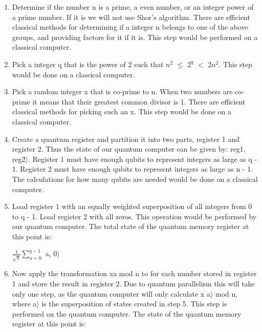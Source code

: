\documentclass{article}
\begin{document}
\begin{enumerate}
    \item
    Determine if the number n is a prime, a even number, or an integer power of a prime number. If it is we will not use Shor's algorithm. There are efficient classical methods for determining if a integer n belongs to one of the above groups, and providing factors for it if it is. This step would be performed on a classical computer.

    \item
    Pick a integer q that is the power of 2 such that $n^2$ $\leq$ $2^q$ $<$ 2$n^2$. This step would be done on a classical computer.

    \item
    Pick a random integer x that is co-prime to n. When two numbers are co-prime it means that their greatest common divisor is 1. There are efficient classical methods for picking such an x. This step would be done on a classical computer.

    \item
    Create a quantum register and partition it into two parts, register 1 and register 2. Thus the state of our quantum computer can be given by: \vert reg1, reg2$ \rangle$. Register 1 must have enough qubits to represent integers as large as q - 1. Register 2 must have enough qubits to represent integers as large as n - 1. The calculations for how many qubits are needed would be done on a classical computer.

    \item
    Load register 1 with an equally weighted superposition of all integers from 0 to q - 1. Load register 2 with all zeros. This operation would be performed by our quantum computer. The total state of the quantum memory register at this point is:

    \begin{center}
    $\displaystyle {\frac{{1}}{{\sqrt{q}}}}$$\displaystyle \sum_{{a = 0}}^{{q - 1}}$ \vert a, 0$\displaystyle \rangle$
    \end{center}

    \item
    Now apply the transformation xa mod n to for each number stored in register 1 and store the result in register 2. Due to quantum parallelism this will take only one step, as the quantum computer will only calculate x \vert a$\scriptstyle \rangle$ mod n, where \vert a$ \rangle$ is the superposition of states created in step 5. This step is performed on the quantum computer. The state of the quantum memory register at this point is:


\end{enumerate}
\end{document}
